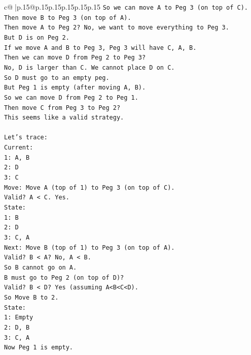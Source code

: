 \documentclass{article}
\begin{document}
{\begin{supertabular}{c@{$\;$}|p{.15\linewidth}@{}p{.15\linewidth}p{.15\linewidth}p{.15\linewidth}p{.15\linewidth}p{.15\linewidth}}
{{{\texttt{So we can move A to Peg 3 (on top of C).} \\
\texttt{Then move B to Peg 3 (on top of A).} \\
\texttt{Then move A to Peg 2? No, we want to move everything to Peg 3.} \\
\texttt{But D is on Peg 2.} \\
\texttt{If we move A and B to Peg 3, Peg 3 will have C, A, B.} \\
\texttt{Then we can move D from Peg 2 to Peg 3?} \\
\texttt{No, D is larger than C. We cannot place D on C.} \\
\texttt{So D must go to an empty peg.} \\
\texttt{But Peg 1 is empty (after moving A, B).} \\
\texttt{So we can move D from Peg 2 to Peg 1.} \\
\texttt{Then move C from Peg 3 to Peg 2?} \\
\texttt{This seems like a valid strategy.} \\
\\ 
\texttt{Let's trace:} \\
\texttt{Current:} \\
\texttt{1: A, B} \\
\texttt{2: D} \\
\texttt{3: C} \\
\texttt{Move: Move A (top of 1) to Peg 3 (on top of C).} \\
\texttt{Valid? A < C. Yes.} \\
\texttt{State:} \\
\texttt{1: B} \\
\texttt{2: D} \\
\texttt{3: C, A} \\
\texttt{Next: Move B (top of 1) to Peg 3 (on top of A).} \\
\texttt{Valid? B < A? No, A < B.} \\
\texttt{So B cannot go on A.} \\
\texttt{B must go to Peg 2 (on top of D)?} \\
\texttt{Valid? B < D? Yes (assuming A<B<C<D).} \\
\texttt{So Move B to 2.} \\
\texttt{State:} \\
\texttt{1: Empty} \\
\texttt{2: D, B} \\
\texttt{3: C, A} \\
\texttt{Now Peg 1 is empty.} \\
}}}
\end{supertabular}}
\end{document}
